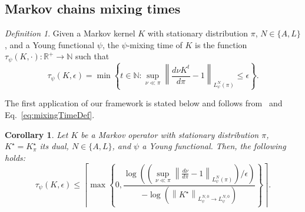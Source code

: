 \documentclass[11pt]{article}
\theoremstyle{plain}
\newtheorem{corollary}{Corollary}[section]
\theoremstyle{remark}
\newtheorem{definition}[theorem]{Definition}
\begin{document}
 \subsection{Markov chains mixing times}\label{sec:mixingTimes}
    \begin{definition}\label{def:alphaMixing}
       Given a Markov kernel $K$ with stationary distribution $\pi$, $N\in\{A, L\}$, and a Young functional $\psi$, the $\psi$-mixing time of $K$ is the function $\tau_\psi(K,\cdot):\mathbb{R}^+\to\mathbb{N}$ such that
      \begin{equation}
           \tau_{\psi}(K,\epsilon) = \min \left\{t \in \mathbb{N} : \sup_{\nu\ll\pi} \left\lVert \frac{d\nu K^t}{d\pi} -1 \right\rVert_{L_\psi^{N}(\pi)} \leq \epsilon \right\}.\label{eq:mixingTimeDef}
       \end{equation}
   \end{definition}
    The first application of our framework is stated below and follows from~ and Eq.~\eqref{eq:mixingTimeDef}.
    \begin{corollary}\label{thm:psiMixingAndContraction}
        Let $K$ be a Markov operator with stationary distribution $\pi$, $K^\star = K^\star_\pi$ its dual, $N\in\{A, L\}$, and $\psi$ a Young functional. Then, the following holds:
       \begin{equation}
            \tau_\psi(K,\epsilon) \leq \left\lceil\max\left\{0,\frac{\log\left(\left(\sup_{\nu\ll\pi}\left\lVert  \frac{d\nu}{d\pi}-1\right\rVert_{L_\psi^{N}(\pi)}\right)/\epsilon\right)}{-\log\left(\left\lVert K^\star\right\rVert_{L_\psi^{N,0}\to L_\psi^{N,0}}\right)}\right\}\right\rceil.\label{eq:mixingTimeBoundPsiNorm}
        \end{equation} 
    \end{corollary}
\end{document}
